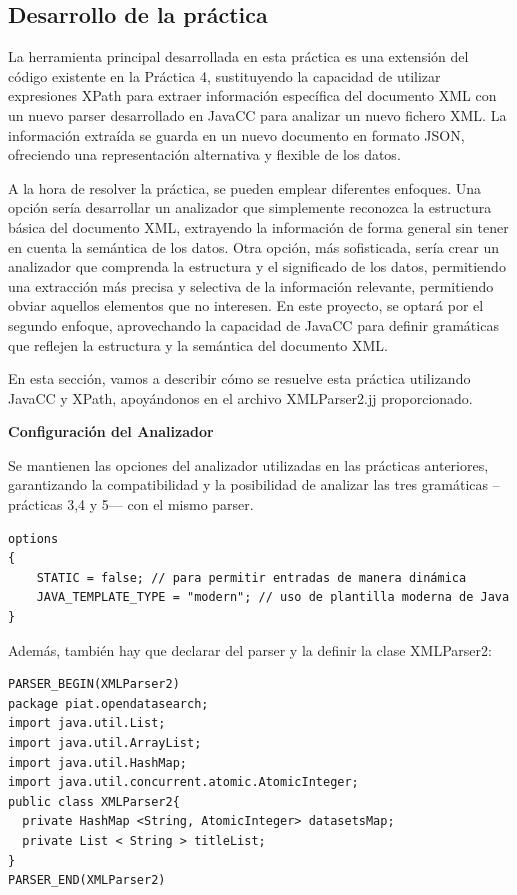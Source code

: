 \subsection{Desarrollo de la práctica}

\noindent La herramienta principal desarrollada en esta práctica es una extensión del código existente en la Práctica 4, sustituyendo la capacidad de utilizar expresiones XPath para extraer información específica del documento XML con un nuevo parser desarrollado en JavaCC para analizar un nuevo fichero XML. La información extraída se guarda en un nuevo documento en formato JSON, ofreciendo una representación alternativa y flexible de los datos.

A la hora de resolver la práctica, se pueden emplear diferentes enfoques. Una opción sería desarrollar un analizador que simplemente reconozca la estructura básica del documento XML, extrayendo la información de forma general sin tener en cuenta la semántica de los datos. Otra opción, más sofisticada, sería crear un analizador que comprenda la estructura y el significado de los datos, permitiendo una extracción más precisa y selectiva de la información relevante, permitiendo obviar aquellos elementos que no interesen. En este proyecto, se optará por el segundo enfoque, aprovechando la capacidad de JavaCC para definir gramáticas que reflejen la estructura y la semántica del documento XML.

En esta sección, vamos a describir cómo se resuelve esta práctica utilizando JavaCC y XPath, apoyándonos en el archivo XMLParser2.jj proporcionado.

\phantom{text}

\noindent \textbf{Configuración del Analizador}

\phantom{text}

Se mantienen las opciones del analizador utilizadas en las prácticas anteriores, garantizando la compatibilidad y la posibilidad de analizar las tres gramáticas --prácticas 3,4 y 5--- con el mismo parser.

\lstset{inputencoding=utf8/latin1}
\begin{lstlisting}
options
{
    STATIC = false; // para permitir entradas de manera dinámica
    JAVA_TEMPLATE_TYPE = "modern"; // uso de plantilla moderna de Java
}
\end{lstlisting}


Además, también hay que declarar del parser y la definir la clase XMLParser2:
\lstset{inputencoding=utf8/latin1}
\begin{lstlisting}
PARSER_BEGIN(XMLParser2)
package piat.opendatasearch;
import java.util.List;
import java.util.ArrayList;
import java.util.HashMap;
import java.util.concurrent.atomic.AtomicInteger;
public class XMLParser2{
  private HashMap <String, AtomicInteger> datasetsMap;
  private List < String > titleList;
}
PARSER_END(XMLParser2) 
\end{lstlisting}

